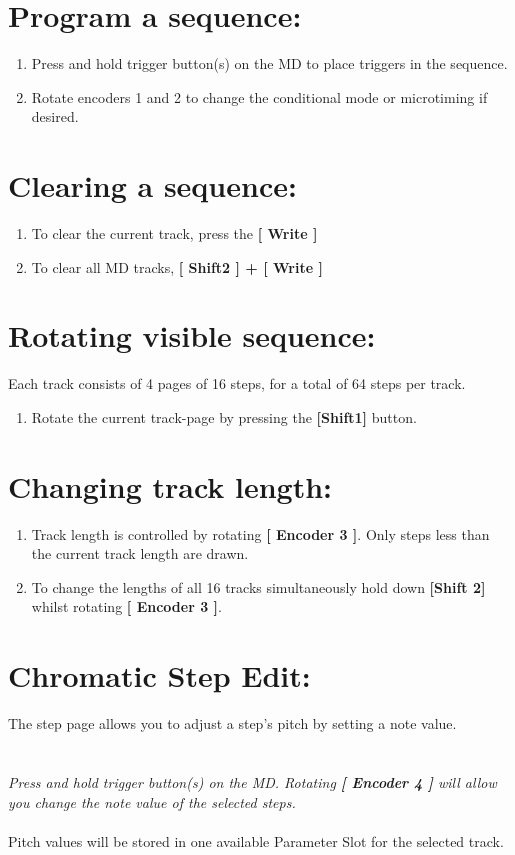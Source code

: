 \section{Program a sequence:}
\begin{enumerate}
\item Press and hold trigger button(s) on the MD to place triggers in the sequence.
\item Rotate encoders 1 and 2 to change the conditional mode or microtiming if desired.
\end{enumerate}
\section{Clearing a sequence:}
\begin{enumerate}
\item To clear the current track, press the\textbf{ [ Write ]}
\item To clear all MD tracks,  \textbf{[ Shift2 ] + [ Write ]}
\end{enumerate}
\section{Rotating visible sequence:}
Each track consists of 4 pages of 16 steps, for a total of 64 steps per track.
\begin{enumerate}
\item Rotate the current track-page by pressing the \textbf{[Shift1] }button.
\end{enumerate}
\section{Changing track length:}
\begin{enumerate}
\item Track length is controlled by rotating \textbf{[ Encoder 3 ]}. Only steps less than the current track length are drawn.
\item To change the lengths of all 16 tracks simultaneously hold down \textbf{[Shift 2]} whilst rotating \textbf{[ Encoder 3 ]}.
\end{enumerate}
\section{Chromatic Step Edit:}
The step page allows you to adjust a step's pitch by setting a note value. 
\\
\\
\\
\textit{Press and hold trigger button(s) on the MD. Rotating \textbf{[ Encoder 4 ]} will allow you change the note value of the selected steps.}\\
\\
Pitch values will be stored in one available Parameter Slot for the selected track.


